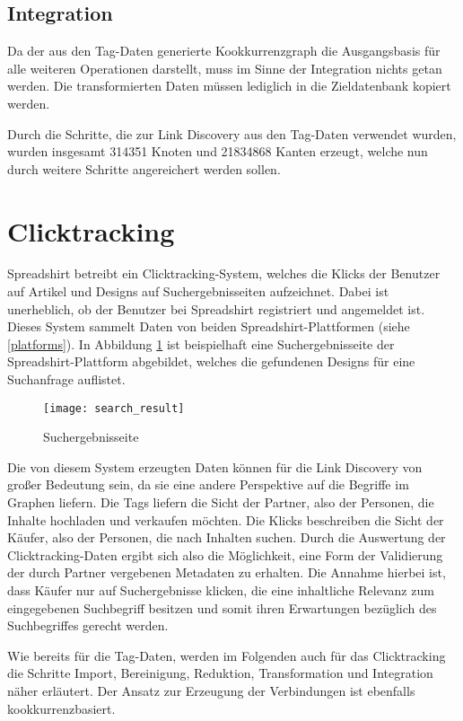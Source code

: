 \subsection{Integration}

Da der aus den Tag-Daten generierte Kookkurrenzgraph die Ausgangsbasis für alle weiteren Operationen darstellt, muss im Sinne der Integration nichts getan werden. Die transformierten Daten müssen lediglich in die Zieldatenbank kopiert werden.

Durch die Schritte, die zur Link Discovery aus den Tag-Daten verwendet wurden, wurden insgesamt \num{314351} Knoten und \num{21834868} Kanten erzeugt, welche nun durch weitere Schritte angereichert werden sollen.

\section{Clicktracking}
\label{clicktracking}

Spreadshirt betreibt ein Clicktracking-System, welches die Klicks der Benutzer auf Artikel und Designs auf Suchergebnisseiten aufzeichnet. Dabei ist unerheblich, ob der Benutzer bei Spreadshirt registriert und angemeldet ist. Dieses System sammelt Daten von beiden Spreadshirt-Plattformen (siehe \ref{platforms}). In Abbildung \ref{fig:search_result} ist beispielhaft eine Suchergebnisseite der Spreadshirt-Plattform abgebildet, welches die gefundenen Designs für eine Suchanfrage auflistet.

\begin{figure}
\centering
\texttt{[image: search\_result]}
\caption{Suchergebnisseite}
\label{fig:search_result}
\end{figure}

Die von diesem System erzeugten Daten können für die Link Discovery von großer Bedeutung sein, da sie eine andere Perspektive auf die Begriffe im Graphen liefern. Die Tags liefern die Sicht der Partner, also der Personen, die Inhalte hochladen und verkaufen möchten. Die Klicks beschreiben die Sicht der Käufer, also der Personen, die nach Inhalten suchen. Durch die Auswertung der Clicktracking-Daten ergibt sich also die Möglichkeit, eine Form der Validierung der durch Partner vergebenen Metadaten zu erhalten. Die Annahme hierbei ist, dass Käufer nur auf Suchergebnisse klicken, die eine inhaltliche Relevanz zum eingegebenen Suchbegriff besitzen und somit ihren Erwartungen bezüglich des Suchbegriffes gerecht werden.

Wie bereits für die Tag-Daten, werden im Folgenden auch für das Clicktracking die Schritte Import, Bereinigung, Reduktion, Transformation und Integration näher erläutert. Der Ansatz zur Erzeugung der Verbindungen ist ebenfalls kookkurrenzbasiert.

